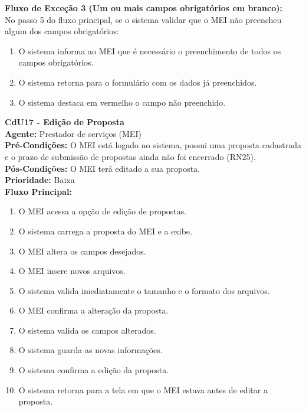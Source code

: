 \noindent\textbf{Fluxo de Exceção 3 (Um ou mais campos obrigatórios em branco):}\\
No passo 5 do fluxo principal, se o sistema validar que o MEI não preencheu algum dos campos obrigatórios:
\begin{enumerate}[noitemsep, topsep=-5pt, parsep=0pt]
    \item O sistema informa ao MEI que é necessário o preenchimento de todos os campos obrigatórios.
    \item O sistema retorna para o formulário com os dados já preenchidos.
    \item O sistema destaca em vermelho o campo não preenchido.
\end{enumerate}


\vspace{7pt}
\noindent\textbf{\normalsize CdU17 - Edição de Proposta}\\
\noindent\textbf{Agente:} Prestador de serviços (MEI)\\ 
\textbf{Pré-Condições:} O MEI está logado no sistema, possui uma proposta cadastrada e o prazo de submissão de propostas ainda não foi encerrado (RN25).\\ 
\textbf{Pós-Condições:} O MEI terá editado a sua proposta.\\
\textbf{Prioridade:} Baixa \vspace{3pt}\\
\noindent\textbf{Fluxo Principal:}
\begin{enumerate}[noitemsep, topsep=-5pt, parsep=0pt]
    \item O MEI acessa a opção de edição de propostas.
    \item O sistema carrega a proposta do MEI e a exibe.
    \item O MEI altera os campos desejados.
    \item O MEI insere novos arquivos.
    \item O sistema valida imediatamente o tamanho e o formato dos arquivos.
    \item O MEI confirma a alteração da proposta.
    \item O sistema valida os campos alterados.
    \item O sistema guarda as novas informações.
    \item O sistema confirma a edição da proposta.
    \item O sistema retorna para a tela em que o MEI estava antes de editar a proposta.
\end{enumerate}

